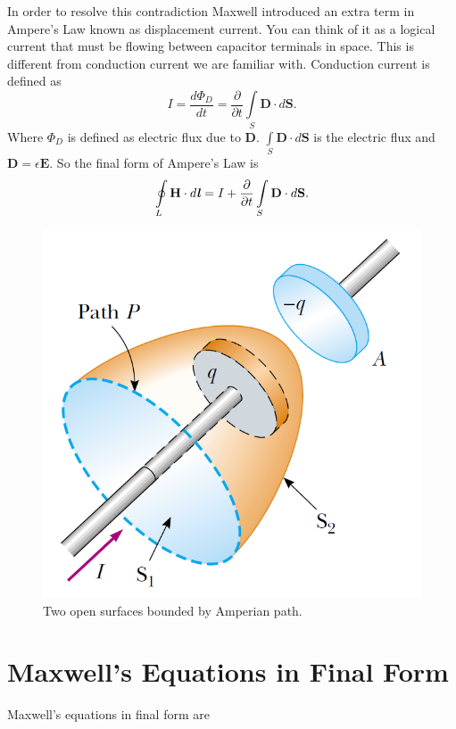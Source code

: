 \documentclass[12pt,a4paper]{article}
\begin{document}
In order to resolve this contradiction Maxwell introduced an extra term in Ampere's Law known as displacement current. You can think of it as a logical current that must be flowing between capacitor terminals in space. This is different from conduction current we are familiar with. Conduction current is defined as
\begin{equation}
I=\dfrac{d\Phi_D}{dt}=\dfrac{\partial}{\partial t}\int\limits_{S}\textbf{D}\cdot d\textbf{S}.
\end{equation}
Where $\Phi_D$ is defined as electric flux due to \textbf{D}. $\int\limits_{S}\textbf{D}\cdot d\textbf{S}$ is the electric flux and $\textbf{D}=\epsilon\textbf{E}$.
So the final form of Ampere's Law is
\begin{equation}
\oint\limits_{L} \textbf{H}\cdot d\textbf{\textit{l}}=I+\dfrac{\partial}{\partial t}\int\limits_{S}\textbf{D}\cdot d\textbf{S}.
\end{equation}
\begin{figure}[H]
\centering
\includegraphics[scale=0.45]{Figure30-25.png}
\caption{Two open surfaces bounded by Amperian path.}
\label{displacement-current}
\end{figure}
\section{Maxwell's Equations in Final Form}
Maxwell's equations in final form are
\end{document}

